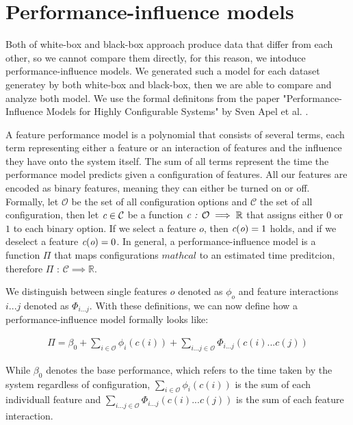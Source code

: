 \chapter{Performance-influence models}\label{ch:performance-influence-models}

Both of white-box and black-box approach produce data that differ from each other, so we cannot compare them directly, for 
this reason, we intoduce performance-influence models. We generated such a model for each dataset generatey by both white-box and black-box, then
we are able to compare and analyze both model. We use the formal definitons from the paper "Performance-Influence Models for
Highly Configurable Systems" by Sven Apel et al. \cite{Performance-influence-models-for-highly-configurable-systems}.

A feature performance model is a polynomial that consists of several terms, each term representing either a feature or an interaction
of features and the influence they have onto the system itself. The sum of all terms represent the time the performance model predicts
given a configuration of features. All our features are encoded as binary features, meaning they can either be turned on or off. Formally, 
let $\mathcal{O}$ be the set of all configuration options and $\mathcal{C}$ the set of all configuration, then  let $\emph{c} \in \mathcal{C}$ be
a function $\emph{c} \textit{ : } \mathcal{O} \implies \mathbb{R}$ that assigns either $0$ or $1$ to each binary option. If we select a feature
$o$, then $\emph{c}(\emph{o}) = 1$ holds, and if we deselect a feature $\emph{c}(\emph{o}) = 0$. In general, a performance-influence
model is a function $\Pi$ that maps configurations $mathcal$ to an estimated time preditcion, therefore $\Pi \textit{ : } \mathcal{C} \implies \mathbb{R}$.

We distinguish between single features $o$ denoted as $\phi_o$ and feature interactions $i ... j$ denoted as $\Phi_{i...j}$. With these
definitions, we can now define how a performance-influence model formally looks like:

\begin{gather}
    \Pi = \beta_0 + \sum_{i \in \mathcal{O}} \phi_i(c(i)) + \sum_{i...j \in \mathcal{O}} \Phi_{i...j}(c(i)...c(j))
\end{gather}

While $\beta_0$ denotes the base performance, which refers to the time taken by the system regardless of configuration, $\sum_{i \in \mathcal{O}} \phi_i(c(i))$
is the sum of each individuall feature and $\sum_{i...j \in \mathcal{O}} \Phi_{i...j}(c(i)...c(j))$ is the sum of each feature interaction.


